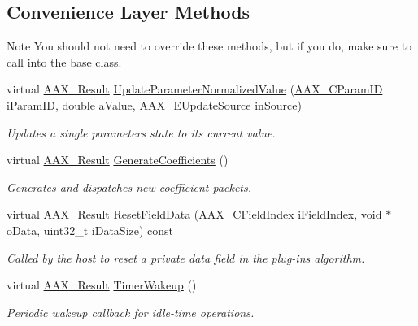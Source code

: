 \subsection*{Convenience Layer Methods}
\label{_amgrpa25aad2c441b64357c88325565684575}%
\begin{DoxyNote}{Note}
You should not need to override these methods, but if you do, make sure to call into the base class. 
\end{DoxyNote}
\begin{DoxyCompactItemize}
\item 
virtual \hyperlink{a00149_a4d8f69a697df7f70c3a8e9b8ee130d2f}{A\+A\+X\+\_\+\+Result} \hyperlink{a00026_a2ebeb6e1cc24277c7e72abbbfbebb5e9}{Update\+Parameter\+Normalized\+Value} (\hyperlink{a00149_a1440c756fe5cb158b78193b2fc1780d1}{A\+A\+X\+\_\+\+C\+Param\+I\+D} i\+Param\+I\+D, double a\+Value, \hyperlink{a00206_a30be0398faf20c6b121239eb9399f3f7}{A\+A\+X\+\_\+\+E\+Update\+Source} in\+Source)
\begin{DoxyCompactList}\small\item\em Updates a single parameter\textquotesingle{}s state to its current value. \end{DoxyCompactList}\item 
virtual \hyperlink{a00149_a4d8f69a697df7f70c3a8e9b8ee130d2f}{A\+A\+X\+\_\+\+Result} \hyperlink{a00026_ac9a3a7ac90562135ceb4b80301e12e92}{Generate\+Coefficients} ()
\begin{DoxyCompactList}\small\item\em Generates and dispatches new coefficient packets. \end{DoxyCompactList}\item 
virtual \hyperlink{a00149_a4d8f69a697df7f70c3a8e9b8ee130d2f}{A\+A\+X\+\_\+\+Result} \hyperlink{a00026_a9b28c682b0495cf0d0eaa4c6c71e3f83}{Reset\+Field\+Data} (\hyperlink{a00149_ae807f8986143820cfb5d6da32165c9c7}{A\+A\+X\+\_\+\+C\+Field\+Index} i\+Field\+Index, void $\ast$o\+Data, uint32\+\_\+t i\+Data\+Size) const 
\begin{DoxyCompactList}\small\item\em Called by the host to reset a private data field in the plug-\/in\textquotesingle{}s algorithm. \end{DoxyCompactList}\item 
virtual \hyperlink{a00149_a4d8f69a697df7f70c3a8e9b8ee130d2f}{A\+A\+X\+\_\+\+Result} \hyperlink{a00026_a397819655fb094188ca4af6543f435f7}{Timer\+Wakeup} ()
\begin{DoxyCompactList}\small\item\em Periodic wakeup callback for idle-\/time operations. \end{DoxyCompactList}\item 

\end{DoxyCompactItemize}
